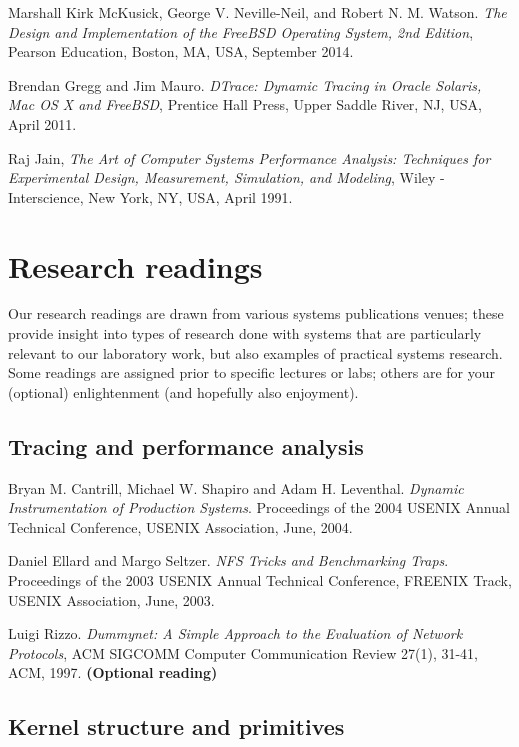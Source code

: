 \documentclass[a4paper,10pt]{article}
\begin{document}
\medskip

\noindent
Marshall Kirk McKusick, George V. Neville-Neil, and Robert N. M. Watson.
\textit{The Design and Implementation of the FreeBSD Operating System, 2nd
Edition}, Pearson Education, Boston, MA, USA, September 2014.


\medskip
\noindent
Brendan Gregg and Jim Mauro. \textit{DTrace: Dynamic Tracing in Oracle
Solaris, Mac OS X and FreeBSD}, Prentice Hall Press, Upper Saddle River, NJ,
USA, April 2011.

\medskip
\noindent
Raj Jain, \textit{The Art of Computer Systems Performance Analysis: Techniques
for Experimental Design, Measurement, Simulation, and Modeling}, Wiley -
Interscience, New York, NY, USA, April 1991.

\section*{Research readings}

Our research readings are drawn from various systems publications venues;
these provide insight into types of research done with systems that are
particularly relevant to our laboratory work, but also examples of practical
systems research.
Some readings are assigned prior to specific lectures or labs; others are for
your (optional) enlightenment (and hopefully also enjoyment).

\subsection*{Tracing and performance analysis}

Bryan M. Cantrill, Michael W. Shapiro and Adam H. Leventhal.  \textit{Dynamic
Instrumentation of Production Systems}.  Proceedings of the 2004 USENIX Annual
Technical Conference, USENIX Association, June, 2004.

\medskip
\noindent
Daniel Ellard and Margo Seltzer.  \textit{NFS Tricks and Benchmarking Traps}.
Proceedings of the 2003 USENIX Annual Technical Conference, FREENIX Track,
USENIX Association, June, 2003.

\medskip
\noindent
Luigi Rizzo.  \textit{Dummynet: A Simple Approach to the Evaluation of Network
Protocols}, ACM SIGCOMM Computer Communication Review 27(1), 31-41, ACM, 1997.
\textbf{(Optional reading)}

\subsection*{Kernel structure and primitives}
\end{document}
